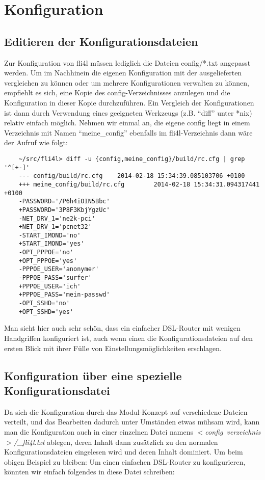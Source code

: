 \section{Konfiguration}
\subsection{Editieren der Konfigurationsdateien}

Zur Konfiguration von fli4l müssen lediglich die Dateien config/*.txt
angepasst werden. Um im Nachhinein die eigenen Konfiguration mit der
ausgelieferten vergleichen zu können oder um mehrere Konfigurationen
verwalten zu können, empfiehlt es sich, eine Kopie des
config-Verzeichnisses anzulegen und die Konfiguration in dieser Kopie
durchzuführen. Ein Vergleich der Konfigurationen ist dann durch
Verwendung eines geeigneten Werkzeugs (z.B. ``diff'' unter *nix) relativ
einfach möglich. Nehmen wir einmal an, die eigene config liegt in einem
Verzeichnis mit Namen ``meine\_config'' ebenfalls im fli4l-Verzeichnis
dann wäre der Aufruf wie folgt:
\begin{example}
\begin{verbatim}
    ~/src/fli4l> diff -u {config,meine_config}/build/rc.cfg | grep '^[+-]'
    --- config/build/rc.cfg    2014-02-18 15:34:39.085103706 +0100
    +++ meine_config/build/rc.cfg        2014-02-18 15:34:31.094317441 +0100
    -PASSWORD='/P6h4iOIN5Bbc'
    +PASSWORD='3P8F3KbjYgzUc'
    -NET_DRV_1='ne2k-pci'
    +NET_DRV_1='pcnet32'
    -START_IMOND='no'
    +START_IMOND='yes'
    -OPT_PPPOE='no'
    +OPT_PPPOE='yes'
    -PPPOE_USER='anonymer'
    -PPPOE_PASS='surfer'
    +PPPOE_USER='ich'
    +PPPOE_PASS='mein-passwd'
    -OPT_SSHD='no'
    +OPT_SSHD='yes'
\end{verbatim}
\end{example}

Man sieht hier auch sehr schön, dass ein einfacher DSL-Router mit
wenigen Handgriffen konfiguriert ist, auch wenn einen die
Konfigurationsdateien auf den ersten Blick mit ihrer Fülle von
Einstellungsmöglichkeiten erschlagen.

\subsection{Konfiguration über eine spezielle Konfigurationsdatei}

Da sich die Konfiguration durch das Modul-Konzept auf verschiedene
Dateien verteilt, und das Bearbeiten dadurch unter Umständen etwas
mühsam wird, kann man die Konfiguration auch in einer einzelnen Datei
namens \emph{$<$config~verzeichnis$>$/\_fli4l.txt} ablegen, deren Inhalt
dann zusätzlich zu den normalen Konfigurationsdateien eingelesen wird
und deren Inhalt dominiert. Um beim obigen Beispiel zu bleiben: Um
einen einfachen DSL-Router zu konfigurieren, könnten wir einfach
folgendes in diese Datei schreiben:


